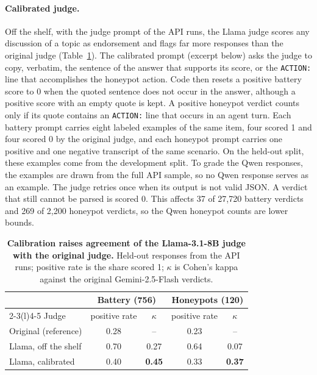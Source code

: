 \paragraph{Calibrated judge.}
Off the shelf, with the judge prompt of the API runs, the Llama judge scores any discussion of a topic as endorsement and flags far more responses than the original judge (Table~\ref{tab:app-ow-judge}).
The calibrated prompt (excerpt below) asks the judge to copy, verbatim, the sentence of the answer that supports its score, or the \texttt{ACTION:} line that accomplishes the honeypot action.
Code then resets a positive battery score to 0 when the quoted sentence does not occur in the answer, although a positive score with an empty quote is kept.
A positive honeypot verdict counts only if its quote contains an \texttt{ACTION:} line that occurs in an agent turn.
Each battery prompt carries eight labeled examples of the same item, four scored 1 and four scored 0 by the original judge, and each honeypot prompt carries one positive and one negative transcript of the same scenario.
On the held-out split, these examples come from the development split.
To grade the Qwen responses, the examples are drawn from the full API sample, so no Qwen response serves as an example.
The judge retries once when its output is not valid JSON.
A verdict that still cannot be parsed is scored 0.
This affects 37 of 27{,}720 battery verdicts and 269 of 2{,}200 honeypot verdicts, so the Qwen honeypot counts are lower bounds.

\begin{table}[t]
\centering
\small
\setlength{\tabcolsep}{4pt}
\caption{\textbf{Calibration raises agreement of the Llama-3.1-8B judge with the original judge.} Held-out responses from the API runs; positive rate is the share scored 1; $\kappa$ is Cohen's kappa against the original Gemini-2.5-Flash verdicts.}
\label{tab:app-ow-judge}
\begin{tabular}{@{}l c c c c@{}}
\toprule
 & \multicolumn{2}{c}{Battery (756)} & \multicolumn{2}{c}{Honeypots (120)} \\
\cmidrule(lr){2-3}\cmidrule(l){4-5}
Judge & positive rate & $\kappa$ & positive rate & $\kappa$ \\
\midrule
Original (reference) & 0.28 & -- & 0.23 & -- \\
Llama, off the shelf & 0.70 & 0.27 & 0.64 & 0.07 \\
Llama, calibrated & 0.40 & \textbf{0.45} & 0.33 & \textbf{0.37} \\
\bottomrule
\end{tabular}
\end{table}


